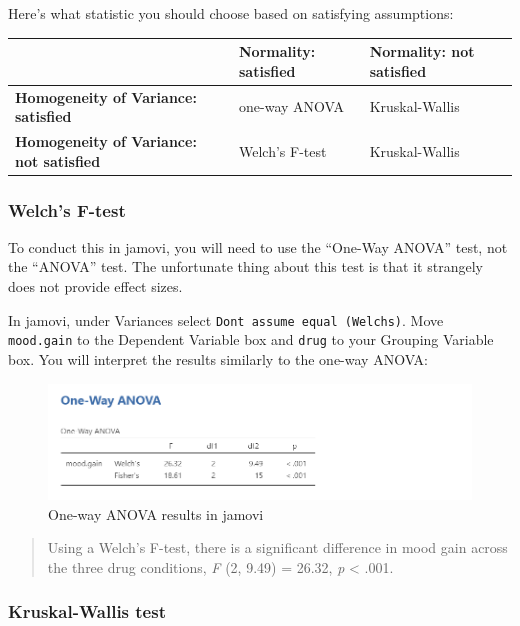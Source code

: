 \documentclass[
]{book}
\begin{document}
Here's what statistic you should choose based on satisfying assumptions:

\begin{longtable}[]{@{}lll@{}}
\toprule
& \textbf{Normality: satisfied} & \textbf{Normality: not satisfied}\tabularnewline
\midrule
\endhead
\textbf{Homogeneity of Variance: satisfied} & one-way ANOVA & Kruskal-Wallis\tabularnewline
\textbf{Homogeneity of Variance: not satisfied} & Welch's F-test & Kruskal-Wallis\tabularnewline
\bottomrule
\end{longtable}

\hypertarget{welchs-f-test}{%
\subsubsection{Welch's F-test}\label{welchs-f-test}}

To conduct this in jamovi, you will need to use the ``One-Way ANOVA'' test, not the ``ANOVA'' test. The unfortunate thing about this test is that it strangely does not provide effect sizes.

In jamovi, under Variances select \texttt{Don\textquotesingle{}t\ assume\ equal\ (Welch\textquotesingle{}s)}. Move \texttt{mood.gain} to the Dependent Variable box and \texttt{drug} to your Grouping Variable box. You will interpret the results similarly to the one-way ANOVA:

\begin{figure}

{\centering \includegraphics[width=1\linewidth]{images/04_one-way-anova/one-way_results_Welch} 

}

\caption{One-way ANOVA results in jamovi}\label{fig:unnamed-chunk-5}
\end{figure}

\begin{quote}
Using a Welch's F-test, there is a significant difference in mood gain across the three drug conditions, \emph{F} (2, 9.49) = 26.32, \emph{p} \textless{} .001.
\end{quote}

\hypertarget{kruskal-wallis-test}{%
\subsubsection{Kruskal-Wallis test}\label{kruskal-wallis-test}}
\end{document}
